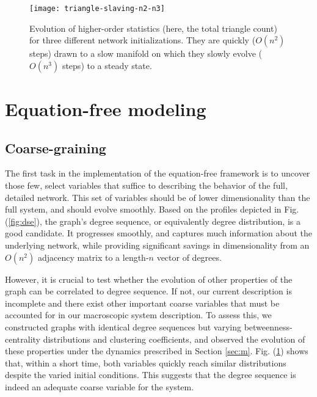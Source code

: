 \documentclass[epjST, final]{svjour}
\begin{document}
\begin{onehalfspace}
\begin{figure}[th!]
    \centering
    \texttt{[image: triangle-slaving-n2-n3]}
  \caption{Evolution of higher-order statistics (here, the total
    triangle count) for three different network initializations. They
    are quickly ($O(n^2)$ steps) drawn to a slow manifold on which
    they slowly evolve ($O(n^3)$ steps) to a steady
    state. \label{fig:sv}}
\end{figure}


\section{Equation-free modeling}
\label{sec:ef}

\subsection{Coarse-graining}

The first task in the implementation of the equation-free framework is to uncover those few, select variables that suffice to describing the behavior of the full, detailed network. This set of variables should be of lower dimensionality than the full system, and should evolve smoothly. Based on the profiles depicted in Fig. (\ref{fig:dse}), the graph's degree sequence, or equivalently degree distribution, is a good candidate. It progresses smoothly, and captures much information about the underlying network, while providing significant savings in dimensionality from an $O(n^2)$ adjacency matrix to a length-$n$ vector of degrees. \par

However, it is crucial to test whether the evolution of other properties of the graph can be correlated to degree sequence. If not, our current description is incomplete and there exist other  important coarse variables that must be accounted for in our macroscopic system description. To assess this, we constructed graphs with identical degree sequences but varying betweenness-centrality distributions and clustering coefficients, and observed the evolution of these properties under the dynamics prescribed in Section \ref{sec:m}. Fig. (\ref{fig:sv}) shows that, within a short time, both variables quickly reach similar distributions despite the varied initial conditions. This suggests that the degree sequence is indeed an adequate coarse variable for the system. \par


\end{onehalfspace}
\end{document}
